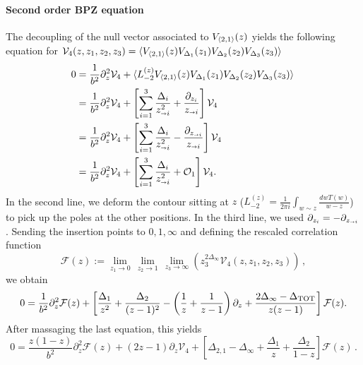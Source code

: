 \documentclass[11pt]{article}
\begin{document}
\paragraph{Second order BPZ equation}
The decoupling of the null vector associated to $V_{\braket{2,1}}(z)$ yields the following equation
for $\mathcal{V}_{4}(z,z_1,z_2,z_3)=\braket{V_{\braket{2,1}}(z)V_{\Delta_1}(z_1)V_{\Delta_2}(z_2)V_{\Delta_3}(z_3)}$
\begin{equation}
\begin{aligned}
  0 &=\frac{1}{b^2}\partial_z^2 \mathcal{V}_{4} +\braket{L_{-2}^{(z)}V_{\braket{2,1}}(z)V_{\Delta_1}(z_1)V_{\Delta_2}(z_2)V_{\Delta_3}(z_3)}\,\\
  &=\frac{1}{b^2}\partial_z^2 \mathcal{V}_{4} +\left[\sum_{i=1}^{3}\frac{\Delta_i}{z_{\shortrightarrow i}^2}+\frac{\partial_{z_i}}{z_{\shortrightarrow i}}\right]\mathcal{V}_{4}\,\\
  &=\frac{1}{b^2}\partial_z^2 \mathcal{V}_{4} +\left[\sum_{i=1}^{3}\frac{\Delta_i}{z_{\shortrightarrow i}^2}-\frac{\partial_{z_{\shortrightarrow i}}}{z_{\shortrightarrow i}}\right]\mathcal{V}_{4}\,\\
  &=\frac{1}{b^2}\partial_z^2 \mathcal{V}_{4} +\left[\sum_{i=1}^{3}\frac{\Delta_i}{z_{\shortrightarrow i}^2}+ \mathcal{O}_1\right]\mathcal{V}_{4}.\\
\end{aligned}
\end{equation}
In the second line, we deform the contour sitting at $z$ ($L_{-2}^{(z)}=\frac{1}{2\pi i}\int_{w \sim z}\frac{dw T(w)}{w-z}$) to pick up the poles at the other positions. In the third line, we used $\partial_{z_i}=-\partial_{z_{\shortrightarrow i}}$. Sending the insertion points to $0,1,\infty$ and defining the rescaled correlation function
\begin{equation}
  \mathcal{F}(z) := \underset{z_1 \to 0}{\lim} \,\underset{z_2 \to 1}{\lim}\, \underset{z_3 \to \infty}{\lim} \left(z_3^{2\Delta_{\infty}}\mathcal{V}_{4}(z,z_1,z_2,z_3)\right)\,,
\end{equation}
we obtain
\begin{equation}
  0 =\frac{1}{b^2}\partial_z^2 \mathcal{F}(z) +\left[\frac{\Delta_1}{z^2}+\frac{\Delta_2}{(z-1)^2}-\left(\frac{1}{z}+\frac{1}{z-1}\right)\partial_z +\frac{2\Delta_{\infty} -\Delta_{\rm TOT}}{z(z-1)}\right]\mathcal{F}(z).\\
\end{equation}
After massaging the last equation, this yields
\begin{equation}
  0 =\frac{z(1-z)}{b^2}\partial_z^2 \mathcal{F}(z) +(2z-1) \partial_z \mathcal{V}_{4} + \left[\Delta_{2,1}-\Delta_{\infty}+\frac{\Delta_1}{z}+\frac{\Delta_2}{1-z}\right]\mathcal{F}(z)\,.
\end{equation}
\end{document}
